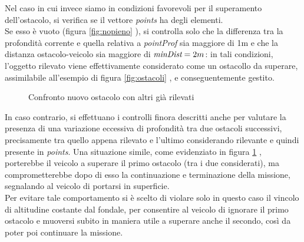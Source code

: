 \documentclass{article}
\begin{document}
            Nel caso in cui invece siamo in condizioni favorevoli per il superamento dell'ostacolo, si verifica se il vettore \emph{points} ha degli elementi.
            \\
            Se esso è vuoto (figura \ref{fig:nopieno} ), si controlla solo che la differenza tra la profondità corrente e quella relativa 
            a \emph{pointProf} sia maggiore di 1m e che la distanza ostacolo-veicolo sia maggiore di $\emph{minDist} =  2m$: in tali condizioni, l'oggetto rilevato viene effettivamente
            considerato come un ostacollo da superare, assimilabile all'esempio di figura \ref{fig:ostacoli} , e conseguentemente gestito.


            
            \begin{figure} [ht]
                \caption{Confronto nuovo ostacolo con altri già rilevati}
                \label{fig:pieno}
            \end{figure}

            In caso contrario,
            si effettuano i controlli finora descritti anche per valutare la presenza di una variazione eccessiva di profondità tra due ostacoli successivi, precisamente
            tra quello appena rilevato e l'ultimo considerando rilevante e quindi presente in \emph{points}. Una situazione simile, come evidenziato in figura \ref{fig:pieno} ,
            porterebbe il veicolo a superare il primo ostacolo (tra i due considerati), ma comprometterebbe dopo di esso la continuazione e terminazione della missione,
            segnalando al veicolo di portarsi in superficie. \\
            Per evitare tale comportamento si è scelto di violare solo in questo caso il vincolo di altitudine costante dal fondale, per consentire al veicolo di ignorare il
            primo ostacolo e muoversi subito in maniera utile a superare anche il secondo, così da poter poi continuare la missione.
\end{document}
